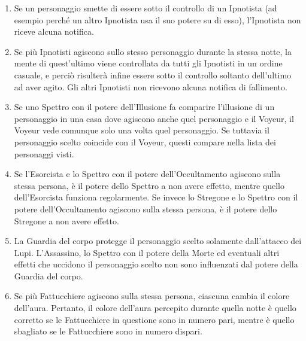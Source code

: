 \documentclass[a4paper,10pt]{article}
\begin{document}
\begin{enumerate}
 \item Se un personaggio smette di essere sotto il controllo di un Ipnotista (ad esempio perché un altro Ipnotista usa il suo potere su di esso), l'Ipnotista non riceve alcuna notifica.
 
 \item Se più Ipnotisti agiscono sullo stesso personaggio durante la stessa notte, la mente di quest'ultimo viene controllata da tutti gli Ipnotisti in un ordine casuale, e perciò risulterà infine essere sotto il controllo soltanto dell'ultimo ad aver agito. Gli altri Ipnotisti non ricevono alcuna notifica di fallimento.
 
 \item Se uno Spettro con il potere dell'Illusione fa comparire l'illusione di un personaggio in una casa dove agiscono anche quel personaggio e il Voyeur, il Voyeur vede comunque solo una volta quel personaggio. Se tuttavia il personaggio scelto coincide con il Voyeur, questi compare nella lista dei personaggi visti.

 \item Se l'Esorcista e lo Spettro con il potere dell'Occultamento agiscono sulla stessa persona, è il potere dello Spettro a non avere effetto, mentre quello dell'Esorcista funziona regolarmente. Se invece lo Stregone e lo Spettro con il potere dell'Occultamento agiscono sulla stessa persona, è il potere dello Stregone a non avere effetto.
 
 \item La Guardia del corpo protegge il personaggio scelto solamente dall'attacco dei Lupi. L'Assassino, lo Spettro con il potere della Morte ed eventuali altri effetti che uccidono il personaggio scelto non sono influenzati dal potere della Guardia del corpo.
 
 
 \item Se più Fattucchiere agiscono sulla stessa persona, ciascuna cambia il colore dell'aura. Pertanto, il colore dell'aura percepito durante quella notte è quello corretto se le Fattucchiere in questione sono in numero pari, mentre è quello sbagliato se le Fattucchiere sono in numero dispari.
 

\end{enumerate}
\end{document}
